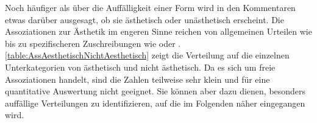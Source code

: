 Noch häufiger als über die Auffälligkeit einer Form wird in den Kommentaren etwas darüber ausgesagt, ob sie ästhetisch oder unästhetisch erscheint. 
Die Assoziationen zur Ästhetik im engeren Sinne reichen von allgemeinen Urteilen wie  bis zu spezifischeren Zuschreibungen wie  oder . 
\autoref{table:AssAesthetischNichtAesthetisch} zeigt die Verteilung auf die einzelnen Unterkategorien von \glqq ästhetisch\grqq{} und \glqq nicht ästhetisch\grqq.
Da es sich um freie Assoziationen handelt, sind die Zahlen teilweise sehr klein und für eine quantitative Auswertung nicht geeignet. 
Sie können aber dazu dienen, besonders auffällige Verteilungen zu identifizieren, auf die im Folgenden näher eingegangen wird. 
